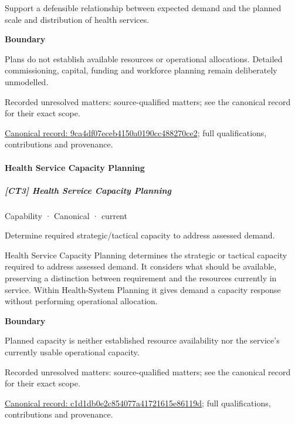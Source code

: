 Support a defensible relationship between expected demand and the planned scale and distribution of health services.



\textbf{Boundary}



Plans do not establish available resources or operational allocations. Detailed commissioning, capital, funding and workforce planning remain deliberately unmodelled.


{\small Recorded unresolved matters: source-qualified matters; see the canonical record for their exact scope.}\par
{\footnotesize \href{../../../../continuum/strategy/capability/9ca4df07eceb4150a0190cc488270ce2.md}{Canonical record: 9ca4df07eceb4150a0190cc488270ce2}; full qualifications, contributions and provenance.}\par
\paragraph{Health Service Capacity Planning}

\subparagraph{[CT3] Health Service Capacity Planning}

\label{element:c1d1db0e2c854077a41721615e86119d}
{\small Capability · Canonical · current}\par

Determine required strategic/tactical capacity to address assessed demand.



Health Service Capacity Planning determines the strategic or tactical capacity required to address assessed demand. It considers what should be available, preserving a distinction between requirement and the resources currently in service. Within Health-System Planning it gives demand a capacity response without performing operational allocation.



\textbf{Boundary}



Planned capacity is neither established resource availability nor the service's currently usable operational capacity.


{\small Recorded unresolved matters: source-qualified matters; see the canonical record for their exact scope.}\par
{\footnotesize \href{../../../../continuum/strategy/capability/c1d1db0e2c854077a41721615e86119d.md}{Canonical record: c1d1db0e2c854077a41721615e86119d}; full qualifications, contributions and provenance.}\par
